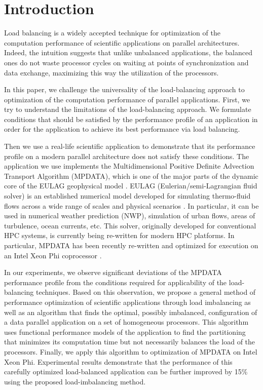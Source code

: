 \documentclass{acm_proc_article-sp}
\begin{document}
\section{Introduction}
\label{sec:intro}
Load balancing is a widely accepted technique for optimization of the computation performance of scientific applications on parallel architectures. Indeed, the intuition suggests that unlike unbalanced applications, the balanced ones do not waste processor cycles on waiting at points of synchronization and data exchange, maximizing this way the utilization of the processors. 

In this paper, we challenge the universality of the load-balancing approach to optimization of the computation performance of parallel applications.  First, we try to understand the limitations of the load-balancing approach. We formulate conditions that should be satisfied by the performance profile of an application in order for the application to achieve its best performance via load balancing.

Then we use a real-life scientific application to demonstrate that its performance profile on a modern parallel architecture does not satisfy these conditions.
The application we use implements the Multidimensional Positive Definite Advection Transport Algorithm (MPDATA), which is one of the major parts of the dynamic core of the EULAG geophysical model \cite{SMO06}.
EULAG (Eulerian/semi-Lagrangian fluid solver) is an established numerical model developed for simulating thermo-fluid flows across a wide range of scales and physical scenarios \cite{PIO12,SMO90}. In particular, it can be used in numerical weather prediction (NWP), simulation of urban flows, areas of turbulence, ocean currents, etc. This solver, originally developed for conventional HPC systems, is currently being re-written for modern HPC platforms. In particular, MPDATA has been recently re-written and optimized for execution on an Intel Xeon Phi coprocessor \cite{SZU13,SZU15}.

In our experiments, we observe significant deviations of the MPDATA performance profile from the conditions required for applicability of the load-balancing techniques. Based on this observation, we propose a general method of performance optimization of scientific applications through load imbalancing as well as an algorithm that finds the optimal, possibly imbalanced, configuration of a data parallel application on a set of homogeneous processors. This algorithm uses functional performance models of the application  \cite{twamley2005, ijhpca2007} to find the partitioning that minimizes its computation time but not necessarily balances the load of the processors. Finally, we apply this algorithm to optimization of MPDATA on Intel Xeon Phi. Experimental results demonstrate that the performance of this carefully optimized load-balanced application can be further improved by 15\% using the proposed load-imbalancing method.
\end{document}
